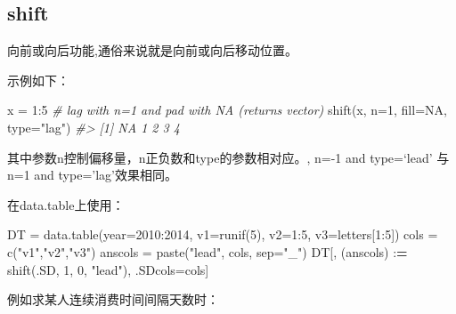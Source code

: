 \documentclass[
]{book}
\newenvironment{Shaded}{\begin{snugshade}}{\end{snugshade}}
\newcommand{\AttributeTok}[1]{\textcolor[rgb]{0.77,0.63,0.00}{#1}}
\newcommand{\CommentTok}[1]{\textcolor[rgb]{0.56,0.35,0.01}{\textit{#1}}}
\newcommand{\ConstantTok}[1]{\textcolor[rgb]{0.00,0.00,0.00}{#1}}
\newcommand{\DecValTok}[1]{\textcolor[rgb]{0.00,0.00,0.81}{#1}}
\newcommand{\ErrorTok}[1]{\textcolor[rgb]{0.64,0.00,0.00}{\textbf{#1}}}
\newcommand{\FunctionTok}[1]{\textcolor[rgb]{0.00,0.00,0.00}{#1}}
\newcommand{\NormalTok}[1]{#1}
\newcommand{\OtherTok}[1]{\textcolor[rgb]{0.56,0.35,0.01}{#1}}
\newcommand{\SpecialCharTok}[1]{\textcolor[rgb]{0.00,0.00,0.00}{#1}}
\newcommand{\StringTok}[1]{\textcolor[rgb]{0.31,0.60,0.02}{#1}}
\begin{document}
\hypertarget{shift}{%
\subsection{shift}\label{shift}}

向前或向后功能,通俗来说就是向前或向后移动位置。

示例如下：

\begin{Shaded}
\begin{Highlighting}[]
\NormalTok{x }\OtherTok{=} \DecValTok{1}\SpecialCharTok{:}\DecValTok{5}
\CommentTok{\# lag with n=1 and pad with NA (returns vector)}
\FunctionTok{shift}\NormalTok{(x, }\AttributeTok{n=}\DecValTok{1}\NormalTok{, }\AttributeTok{fill=}\ConstantTok{NA}\NormalTok{, }\AttributeTok{type=}\StringTok{"lag"}\NormalTok{)}
\CommentTok{\#\textgreater{} [1] NA  1  2  3  4}
\end{Highlighting}
\end{Shaded}

其中参数n控制偏移量，n正负数和type的参数相对应。, n=-1 and type=`lead' 与 n=1 and type='lag'效果相同。

在data.table上使用：

\begin{Shaded}
\begin{Highlighting}[]
\NormalTok{DT }\OtherTok{=} \FunctionTok{data.table}\NormalTok{(}\AttributeTok{year=}\DecValTok{2010}\SpecialCharTok{:}\DecValTok{2014}\NormalTok{, }\AttributeTok{v1=}\FunctionTok{runif}\NormalTok{(}\DecValTok{5}\NormalTok{), }\AttributeTok{v2=}\DecValTok{1}\SpecialCharTok{:}\DecValTok{5}\NormalTok{, }\AttributeTok{v3=}\NormalTok{letters[}\DecValTok{1}\SpecialCharTok{:}\DecValTok{5}\NormalTok{])}
\NormalTok{cols }\OtherTok{=} \FunctionTok{c}\NormalTok{(}\StringTok{"v1"}\NormalTok{,}\StringTok{"v2"}\NormalTok{,}\StringTok{"v3"}\NormalTok{)}
\NormalTok{anscols }\OtherTok{=} \FunctionTok{paste}\NormalTok{(}\StringTok{"lead"}\NormalTok{, cols, }\AttributeTok{sep=}\StringTok{"\_"}\NormalTok{)}
\NormalTok{DT[, (anscols) }\SpecialCharTok{:}\ErrorTok{=} \FunctionTok{shift}\NormalTok{(.SD, }\DecValTok{1}\NormalTok{, }\DecValTok{0}\NormalTok{, }\StringTok{"lead"}\NormalTok{), .SDcols}\OtherTok{=}\NormalTok{cols]}
\end{Highlighting}
\end{Shaded}

例如求某人连续消费时间间隔天数时：
\end{document}
